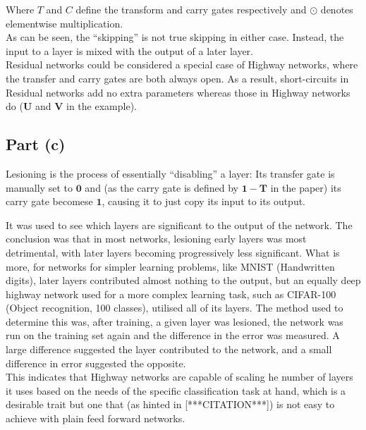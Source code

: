 Where $T$ and $C$ define the transform and carry gates respectively and $\odot$ denotes elementwise multiplication.\\[1em]

As can be seen, the ``skipping'' is not true skipping in either case. Instead, the input to a layer is mixed with the output of a later layer.\\[1em]

Residual networks could be considered a special case of Highway networks, where the transfer and carry gates are both always open. As a result, short-circuits in Residual networks add no extra parameters whereas those in Highway networks do ($\mathbf{U}$ and $\mathbf{V}$ in the example).\\[1em]

\subsection{Part (c)}

Lesioning is the process of essentially ``disabling'' a layer: Its transfer gate is manually set to $\mathbf{0}$ and (as the carry gate is defined by $\mathbf{1}-\mathbf{T}$ in the paper) its carry gate becomese $\mathbf{1}$, causing it to just copy its input to its output.

It was used to see which layers are significant to the output of the network. The conclusion was that in most networks, lesioning early layers was most detrimental, with later layers becoming progressively less significant. What is more, for networks for simpler learning problems, like MNIST (Handwritten digits), later layers contributed almost nothing to the output, but an equally deep highway network used for a more complex learning task, such as CIFAR-100 (Object recognition, 100 classes), utilised all of its layers. The method used to determine this was, after training, a given layer was lesioned, the network was run on the training set again and the difference in the error was measured. A large difference suggested the layer contributed to the network, and a small difference in error suggested the opposite.\\[1em]

This indicates that Highway networks are capable of scaling he number of layers it uses based on the needs of the specific classification task at hand, which is a desirable trait but one that (as hinted in [***CITATION***]) is not easy to achieve with plain feed forward networks.
